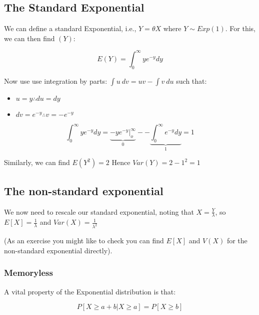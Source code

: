 \documentclass[12pt]{extbook}
\begin{document}
\subsection{The Standard Exponential}

We can define a standard Exponential, i.e., $Y=\theta X$ where $Y \sim Exp(1)$.
For this, we can then find $(Y)$:

\begin{displaymath}
E(Y) = \int_{0}^{\infty} y e^{-y}dy
\end{displaymath}

Now use use integration by parts: $\int u\ dv = uv - \int v\ du$ such that:
\begin{itemize}
\item[] $u=y \therefore du=dy$
\item[] $dv=e^{-y} \therefore v=-e^{-y}$
\end{itemize}

\begin{displaymath}
\int_{0}^{\infty} y e^{-y}dy = \underbrace{-ye^{-y}|^{\infty}_o}_{0} - -\underbrace{\int_0^{\infty} e^{-y}dy}_{1} = 1
\end{displaymath}

Similarly, we can find $E(Y^2)=2$   Hence $Var(Y) = 2-1^2=1$


\subsection{The non-standard exponential}

We now need to rescale our standard exponential, noting that $X=\frac{Y}{\lambda}$, so $E[X] = \frac{1}{\lambda}$ and $Var(X)=\frac{1}{\lambda^2}$

(As an exercise you might like to check you can find $E[X]$ and $V(X)$ for the non-standard exponential directly).




\subsubsection{Memoryless}

A vital property of the Exponential distribution is that:

\begin{displaymath}
P[X \geq a+b | X \geq a] = P[X \geq b]
\end{displaymath}
\end{document}

